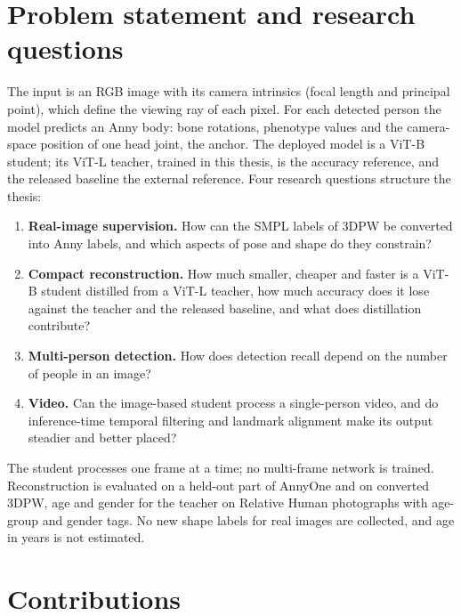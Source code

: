 \section{Problem statement and research questions}
\label{sec:intro-requirements}

The input is an RGB image with its camera intrinsics (focal length and principal point), which define the viewing
ray of each pixel. For each detected person the model predicts an Anny body: bone rotations, phenotype values and the
camera-space position of one head joint, the anchor. The deployed model is a ViT-B student; its ViT-L teacher, trained
in this thesis, is the accuracy reference, and the released baseline the external reference. Four research
questions structure the thesis:
\begin{enumerate}
\item \textbf{Real-image supervision.} How can the SMPL labels of 3DPW be converted into Anny labels, and which
  aspects of pose and shape do they constrain?
\item \textbf{Compact reconstruction.} How much smaller, cheaper and faster is a ViT-B student distilled from a ViT-L
  teacher, how much accuracy does it lose against the teacher and the released baseline, and what does distillation
  contribute?
\item \textbf{Multi-person detection.} How does detection recall depend on the number of people in an image?
\item \textbf{Video.} Can the image-based student process a single-person video, and do inference-time temporal filtering and
  landmark alignment make its output steadier and better placed?
\end{enumerate}

The student processes one frame at a time; no multi-frame network is trained. Reconstruction is evaluated on a
held-out part of AnnyOne and on converted 3DPW, age and gender for the teacher on Relative Human photographs with
age-group and gender tags. No new shape labels for real images are collected, and age in years is not estimated.

\section{Contributions}
\label{sec:intro-contrib}

